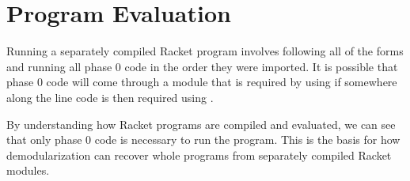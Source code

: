 \section{Program Evaluation}
Running a separately compiled Racket program involves following all of the  forms and running all phase 0 code in the order they were imported.
It is possible that phase 0 code will come through a module that is required by using  if somewhere along the line code is then required using .

By understanding how Racket programs are compiled and evaluated, we can see that only phase 0 code is necessary to run the program. 
This is the basis for how demodularization can recover whole programs from separately compiled Racket modules. 
